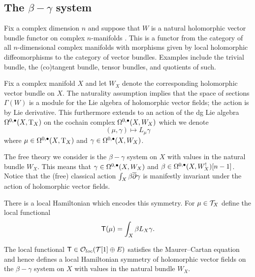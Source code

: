 \documentclass[11pt]{amsart}
\begin{document}
\subsection{The $\beta-\gamma$ system}

Fix a complex dimension $n$ and suppose that $W$ is a natural holomorphic vector bundle functor on complex
$n$-manifolds \cite{MK}.
This is a functor from the category of all $n$-dimensional complex manifolds with morphisms given by local holomorphic
diffeomorphisms to the category of vector bundles.
Examples include the trivial bundle, the (co)tangent bundle, tensor bundles, and quotients of such.

Fix a complex manifold $X$ and let $W_X$ denote the corresponding holomorphic vector bundle on $X$.
The naturality assumption implies that the space of sections $\Gamma(W)$ is a module for the Lie algebra of holomorphic vector
fields; the action is by Lie derivative.
This furthermore extends to an action of the dg Lie algebra $\Omega^{0,\bullet}(X,{\rm T}_X)$ on the cochain complex
$\Omega^{0,\bullet}(X,W_X)$ which we denote 
\begin{equation}\label{}
  (\mu, \gamma) \mapsto L_\mu \gamma 
\end{equation}
where $\mu \in \Omega^{0,\bullet}(X,{\rm T}_X)$ and $\gamma \in \Omega^{0,\bullet}(X,W_X)$.

The free theory we consider is the $\beta-\gamma$ system on $X$ with values in the natural bundle $W_X$.
This means that $\gamma \in \Omega^{0,\bullet}(X,W_X)$ and $\beta \in \Omega^{0,\bullet}(X,W_X^!)[n-1]$.
Notice that the (free) classical action $\int_X \beta \overline{\partial} \gamma$ is manifestly invariant under the action of
holomorphic vector fields.

There is a local Hamiltonian which encodes this symmetry.
For $\mu \in \mathcal T_X$ define the local functional 
\begin{equation}\label{}
  \mathsf T(\mu) = \int_X \beta L_X \gamma .
\end{equation}

\begin{prop}
  The local functional $\mathsf T \in {\mathcal O}_{loc}(\mathcal T[1] \oplus E)$ satisfies the Maurer--Cartan equation and hence defines a
  local Hamiltonian symmetry of holomorphic vector fields on the $\beta-\gamma$ system on $X$ with values in the
  natural bundle $W_X$.
\end{prop}
\end{document}

